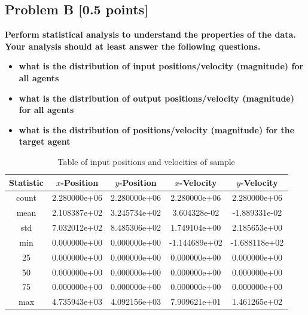 \documentclass{article}
\begin{document}
      

    \subsection{Problem B [0.5 points]}
      \textbf{Perform statistical analysis to understand the properties of the data. Your analysis should at least
      answer the following questions.}
      
      \begin{itemize}
        \item \textbf{what is the distribution of input positions/velocity (magnitude) for all agents}
        \item \textbf{what is the distribution of output positions/velocity (magnitude) for all agents}
        \item \textbf{what is the distribution of positions/velocity (magnitude) for the target agent}
      \end{itemize}

      \begin{table}[h!]
        \centering
        \begin{tabular}{|| c | c c c c||} 
        \hline
        Statistic & $x$-Position & $y$-Position & $x$-Velocity & $y$-Velocity\\ [0.5ex] 
        \hline\hline
        count &	2.280000e+06 & 2.280000e+06 & 2.280000e+06 & 2.280000e+06\\
        mean & 2.108387e+02 & 3.245734e+02 & 3.604328e-02 & -1.889331e-02\\
        std & 7.032012e+02 & 8.485306e+02 & 1.749104e+00 & 2.185653e+00\\
        min & 0.000000e+00 & 0.000000e+00 & -1.144689e+02 & -1.688118e+02\\
        25 & 0.000000e+00 & 0.000000e+00 & 0.000000e+00 & 0.000000e+00\\
        50 & 0.000000e+00 & 0.000000e+00 & 0.000000e+00 & 0.000000e+00\\
        75 & 0.000000e+00 & 0.000000e+00 & 0.000000e+00 & 0.000000e+00\\
        max & 4.735943e+03 & 4.092156e+03 & 7.909621e+01 & 1.461265e+02\\
        \hline
        \end{tabular}
        \caption{Table of input positions and velocities of sample}
        \label{table:1}
    \end{table}
    
\end{document}

